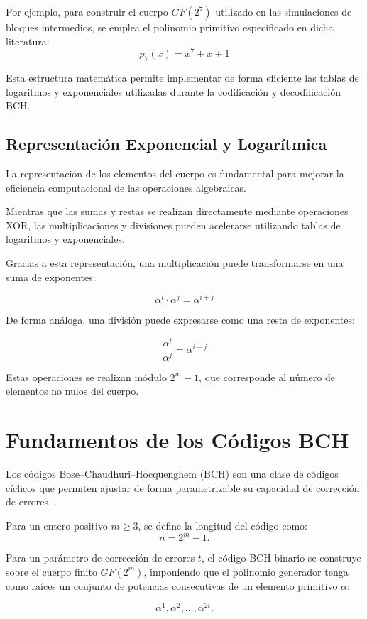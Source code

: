Por ejemplo, para construir el cuerpo $GF(2^7)$ utilizado en las simulaciones de bloques intermedios, se emplea el polinomio primitivo especificado en dicha literatura:
$$
p_7(x)=x^7+x+1
$$

Esta estructura matemática permite implementar de forma eficiente las tablas de logaritmos y exponenciales utilizadas durante la codificación y decodificación BCH.


\subsection{Representación Exponencial y Logarítmica}

La representación de los elementos del cuerpo es fundamental para mejorar la eficiencia computacional de las operaciones algebraicas.

Mientras que las sumas y restas se realizan directamente mediante operaciones XOR, las multiplicaciones y divisiones pueden acelerarse utilizando tablas de logaritmos y exponenciales.

Gracias a esta representación, una multiplicación puede transformarse en una suma de exponentes:

$$
\alpha^i \cdot \alpha^j = \alpha^{i+j}
$$

De forma análoga, una división puede expresarse como una resta de exponentes:

$$
\frac{\alpha^i}{\alpha^j} = \alpha^{i-j}
$$

Estas operaciones se realizan módulo $2^m-1$, que corresponde al número de elementos no nulos del cuerpo.


\section{Fundamentos de los Códigos BCH}
\label{sec:fundamentos_bch}

Los códigos Bose--Chaudhuri--Hocquenghem (BCH) son una clase de códigos cíclicos que permiten ajustar de forma parametrizable su capacidad de corrección de errores~\cite{lin2004error}.

Para un entero positivo \(m \geq 3\), se define la longitud del código como:
\[
n = 2^m - 1.
\]

Para un parámetro de corrección de errores \(t\), el código BCH binario se construye sobre el cuerpo finito \(GF(2^m)\), imponiendo que el polinomio generador tenga como raíces un conjunto de potencias consecutivas de un elemento primitivo \(\alpha\):

\[
\alpha^1, \alpha^2, \dots, \alpha^{2t}.
\]

